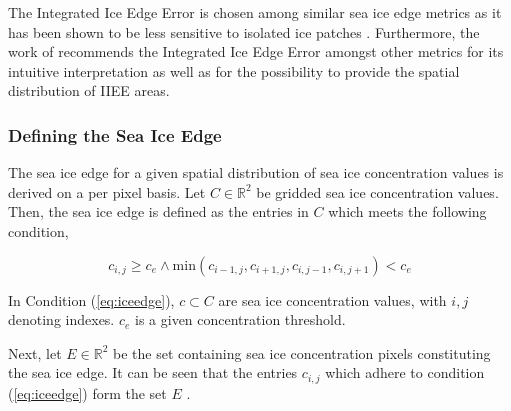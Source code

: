 \documentclass[../main/thesis.tex]{subfiles}
\begin{document}
The Integrated Ice Edge Error is chosen among similar sea ice edge metrics \citep{Melsom2019, Dukhovskoy2015} as it has been shown to be less sensitive to isolated ice patches \citep{Palerme2019}. Furthermore, the work of \citet{Melsom2019} recommends the Integrated Ice Edge Error amongst other metrics for its intuitive interpretation as well as for the possibility to provide the spatial distribution of IIEE areas.




\subsubsection{Defining the Sea Ice Edge}
\label{sec:iceedgelength}
The sea ice edge for a given spatial distribution of sea ice concentration values is derived on a per pixel basis. Let $C \in{\mathbb{R}^2}$ be gridded sea ice concentration values. Then, the sea ice edge is defined as the entries in $C$ which meets the following condition,

\begin{equation}
    \label{eq:iceedge}
    c_{i,j} \geq c_e \wedge \text{min}{(c_{i-1,j},c_{i+1,j},c_{i,j-1},c_{i,j+1})} < c_e
\end{equation}

In Condition (\ref{eq:iceedge}), $c \subset C$ are sea ice concentration values, with $i,j$ denoting indexes. $c_e$ is a given concentration threshold.

Next, let $E \in{\mathbb{R}^2}$ be the set containing sea ice concentration pixels constituting the sea ice edge. It can be seen that the entries $c_{i,j}$ which adhere to condition (\ref{eq:iceedge}) form the set $E$ \citep{Melsom2019}.
\end{document}
